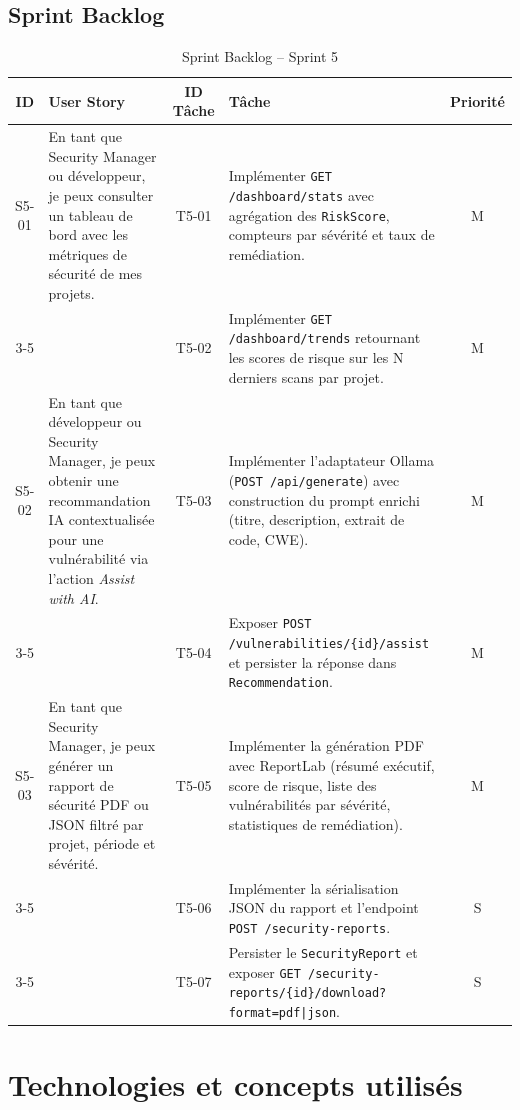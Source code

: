 \subsection{Sprint Backlog}
\begin{table}[H]
\centering
\caption{Sprint Backlog -- Sprint 5}
\label{tab:sprint5-backlog}
\small
\renewcommand{\arraystretch}{1.3}
\begin{tabularx}{\textwidth}{c X c X c}
\hline
\rowcolor{gray!15}
\textbf{ID} & \textbf{User Story} & \textbf{ID Tâche} & \textbf{Tâche} & \textbf{Priorité} \\
\hline
S5-01 & En tant que Security Manager ou développeur, je peux consulter un tableau de bord avec les métriques de sécurité de mes projets.
  & T5-01 & Implémenter \texttt{GET /dashboard/stats} avec agrégation des \texttt{RiskScore}, compteurs par sévérité et taux de remédiation. & M \\
\cline{3-5}
  & & T5-02 & Implémenter \texttt{GET /dashboard/trends} retournant les scores de risque sur les N derniers scans par projet. & M \\
\hline
S5-02 & En tant que développeur ou Security Manager, je peux obtenir une recommandation IA contextualisée pour une vulnérabilité via l'action \textit{Assist with AI}.
  & T5-03 & Implémenter l'adaptateur Ollama (\texttt{POST /api/generate}) avec construction du prompt enrichi (titre, description, extrait de code, CWE). & M \\
\cline{3-5}
  & & T5-04 & Exposer \texttt{POST /vulnerabilities/\{id\}/assist} et persister la réponse dans \texttt{Recommendation}. & M \\
\hline
S5-03 & En tant que Security Manager, je peux générer un rapport de sécurité PDF ou JSON filtré par projet, période et sévérité.
  & T5-05 & Implémenter la génération PDF avec ReportLab (résumé exécutif, score de risque, liste des vulnérabilités par sévérité, statistiques de remédiation). & M \\
\cline{3-5}
  & & T5-06 & Implémenter la sérialisation JSON du rapport et l'endpoint \texttt{POST /security-reports}. & S \\
\cline{3-5}
  & & T5-07 & Persister le \texttt{SecurityReport} et exposer \texttt{GET /security-reports/\{id\}/download?format=pdf|json}. & S \\
\hline
\end{tabularx}
\end{table}

\section{Technologies et concepts utilisés}

